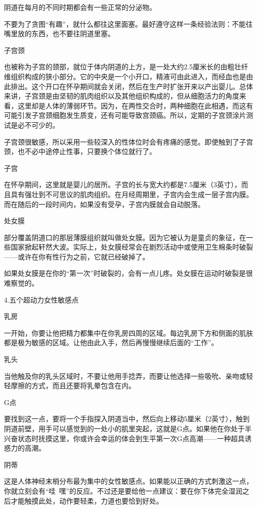 \documentclass[12pt,UTF8]{ctexbook}
\begin{document}
阴道在每月的不同时期都会有一些正常的分泌物。

不要为了贪图“有趣”，就什么都往这里面塞。最好遵守这样一条经验法则：不能往嘴里放的东西，也不要往阴道里塞。

子宫颈

也被称为子宫的颈部，就位于体内阴道的上方，是一处大约2.5厘米长的由粗壮纤维组织构成的狭小部分。它的中央是一个小开口，精液可由此进入，而经血也是由此排出。这个开口在怀孕期间就会关闭，然后在生产时扩张开来以产出婴儿。总体来讲，子宫颈是由坚韧的肌肉组织以及其他组织构成的，但从细胞活力的角度来看，这里却是人体的薄弱环节。因为，在两性交合时，两种细胞在此相遇，而这有可能引发子宫颈细胞发生质变，还有可能导致宫颈癌。所以，定期的子宫颈涂片测试是必不可少的。

子宫颈很敏感，所以采用一些较深入的性体位时会有疼痛的感觉。即使触到了子宫颈，也不必中途停止性事，只要换个体位就行了。

子宫

在怀孕期间，这里就是婴儿的居所。子宫的长与宽大约都是7.5厘米（3英寸），而且具有强壮到不可思议的肌肉组织。在月经周期里，子宫内会生成一层子宫内膜。而在随后的一段时间内，如果没有受孕，子宫内膜就会自动脱落。

处女膜

部分覆盖阴道口的那层薄膜组织就叫做处女膜。因为它被认为是童贞的象征，在一些国家掀起轩然大波。实际上，处女膜经常会在剧烈活动中或使用卫生棉条时破裂——或许在你有性行为之前，它就已经破掉了。

如果处女膜是在你的“第一次”时破裂的，会有一点儿疼。处女膜在运动时破裂是很难察觉的。

4.五个超动力女性敏感点

乳房

一开始，你要让他把精力都集中在你乳房四周的区域。每边乳房下方和侧面的肌肤都是极为敏感的区域。让他由此入手，然后再慢慢继续后面的“工作”。

乳头

当他触及你的乳头区域时，不要让他用手捻弄，而要让他选择一些吸吮、亲吻或轻轻摩擦的方式，而且还要将乳晕包含在内。

G点

要找到这一点，要将一个手指探入阴道当中，然后向上移动5厘米（2英寸），触到阴道前壁，用手可以感觉到的一处小的肌里突起，这就是G点。如果他在你处于半兴奋状态时抚摸这里，你或许会幸运的体会到生平第一次G点高潮——一种超具诱惑力的高潮。

阴蒂

这是人体神经末梢分布最为集中的女性敏感点。如果能以正确的方式刺激这一点，你就立刻会有“哇~嘿”的反应。不过还是要给他一点建议：要在你下体完全湿润之后才能触摸此处，动作要轻柔，力道也要恰到好处。
\end{document}
